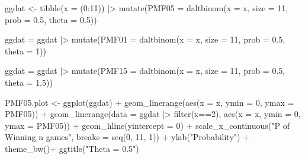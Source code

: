 \documentclass[
]{article}
\newenvironment{Shaded}{\begin{snugshade}}{\end{snugshade}}
\newcommand{\AttributeTok}[1]{\textcolor[rgb]{0.40,0.45,0.13}{#1}}
\newcommand{\DecValTok}[1]{\textcolor[rgb]{0.68,0.00,0.00}{#1}}
\newcommand{\FloatTok}[1]{\textcolor[rgb]{0.68,0.00,0.00}{#1}}
\newcommand{\FunctionTok}[1]{\textcolor[rgb]{0.28,0.35,0.67}{#1}}
\newcommand{\NormalTok}[1]{\textcolor[rgb]{0.00,0.23,0.31}{#1}}
\newcommand{\OtherTok}[1]{\textcolor[rgb]{0.00,0.23,0.31}{#1}}
\newcommand{\SpecialCharTok}[1]{\textcolor[rgb]{0.37,0.37,0.37}{#1}}
\newcommand{\StringTok}[1]{\textcolor[rgb]{0.13,0.47,0.30}{#1}}
\begin{document}
\begin{Shaded}
\begin{Highlighting}[numbers=left,,]
\NormalTok{ggdat }\OtherTok{\textless{}{-}} \FunctionTok{tibble}\NormalTok{(}\AttributeTok{x =}\NormalTok{ (}\DecValTok{0}\SpecialCharTok{:}\DecValTok{11}\NormalTok{)) }\SpecialCharTok{|\textgreater{}}
  \FunctionTok{mutate}\NormalTok{(}\AttributeTok{PMF05 =} \FunctionTok{daltbinom}\NormalTok{(}\AttributeTok{x =}\NormalTok{ x, }\AttributeTok{size =} \DecValTok{11}\NormalTok{, }\AttributeTok{prob =} \FloatTok{0.5}\NormalTok{, }\AttributeTok{theta =} \FloatTok{0.5}\NormalTok{)) }

\NormalTok{ggdat }\OtherTok{=}\NormalTok{ ggdat }\SpecialCharTok{|\textgreater{}}
       \FunctionTok{mutate}\NormalTok{(}\AttributeTok{PMF01 =} \FunctionTok{daltbinom}\NormalTok{(}\AttributeTok{x =}\NormalTok{ x, }\AttributeTok{size =} \DecValTok{11}\NormalTok{, }\AttributeTok{prob =} \FloatTok{0.5}\NormalTok{, }\AttributeTok{theta =} \DecValTok{1}\NormalTok{))}

\NormalTok{ggdat }\OtherTok{=}\NormalTok{ ggdat }\SpecialCharTok{|\textgreater{}}
      \FunctionTok{mutate}\NormalTok{(}\AttributeTok{PMF15 =} \FunctionTok{daltbinom}\NormalTok{(}\AttributeTok{x =}\NormalTok{ x, }\AttributeTok{size =} \DecValTok{11}\NormalTok{, }\AttributeTok{prob =} \FloatTok{0.5}\NormalTok{, }\AttributeTok{theta =} \FloatTok{1.5}\NormalTok{))}



\NormalTok{PMF05.plot }\OtherTok{\textless{}{-}} \FunctionTok{ggplot}\NormalTok{(ggdat) }\SpecialCharTok{+}
\FunctionTok{geom\_linerange}\NormalTok{(}\FunctionTok{aes}\NormalTok{(}\AttributeTok{x =}\NormalTok{ x, }\AttributeTok{ymin =} \DecValTok{0}\NormalTok{, }\AttributeTok{ymax =}\NormalTok{ PMF05)) }\SpecialCharTok{+}
\FunctionTok{geom\_linerange}\NormalTok{(}\AttributeTok{data =}\NormalTok{ ggdat }\SpecialCharTok{|\textgreater{}} \FunctionTok{filter}\NormalTok{(x}\SpecialCharTok{==}\DecValTok{2}\NormalTok{),}
\FunctionTok{aes}\NormalTok{(}\AttributeTok{x =}\NormalTok{ x, }\AttributeTok{ymin =} \DecValTok{0}\NormalTok{, }\AttributeTok{ymax =}\NormalTok{ PMF05)) }\SpecialCharTok{+}
\FunctionTok{geom\_hline}\NormalTok{(}\AttributeTok{yintercept =} \DecValTok{0}\NormalTok{) }\SpecialCharTok{+}
\FunctionTok{scale\_x\_continuous}\NormalTok{(}\StringTok{"P of Winning n games"}\NormalTok{,}
\AttributeTok{breaks =} \FunctionTok{seq}\NormalTok{(}\DecValTok{0}\NormalTok{, }\DecValTok{11}\NormalTok{, }\DecValTok{1}\NormalTok{)) }\SpecialCharTok{+}
\FunctionTok{ylab}\NormalTok{(}\StringTok{"Probability"}\NormalTok{) }\SpecialCharTok{+}
\FunctionTok{theme\_bw}\NormalTok{()}\SpecialCharTok{+}
\FunctionTok{ggtitle}\NormalTok{(}\StringTok{"Theta = 0.5"}\NormalTok{)}



\end{Highlighting}
\end{Shaded}
\end{document}
